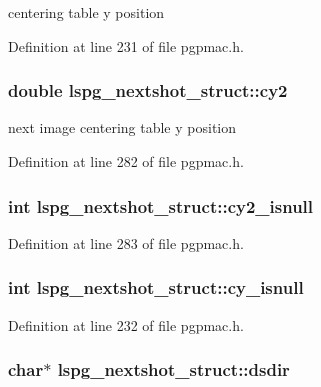 centering table y position 



Definition at line 231 of file pgpmac.\-h.

\hypertarget{structlspg__nextshot__struct_a3644e5c3f12af18a3b426d4d4d7e16a5}{
\subsubsection[{cy2}]{\setlength{\rightskip}{0pt plus 5cm}double lspg\-\_\-nextshot\-\_\-struct\-::cy2}}\label{structlspg__nextshot__struct_a3644e5c3f12af18a3b426d4d4d7e16a5}


next image centering table y position 



Definition at line 282 of file pgpmac.\-h.

\hypertarget{structlspg__nextshot__struct_a57d78a389413827302df6ebe3dcb3c89}{
\subsubsection[{cy2\-\_\-isnull}]{\setlength{\rightskip}{0pt plus 5cm}int lspg\-\_\-nextshot\-\_\-struct\-::cy2\-\_\-isnull}}\label{structlspg__nextshot__struct_a57d78a389413827302df6ebe3dcb3c89}


Definition at line 283 of file pgpmac.\-h.

\hypertarget{structlspg__nextshot__struct_a3895d645420848aed05b95694ec8c6c7}{
\subsubsection[{cy\-\_\-isnull}]{\setlength{\rightskip}{0pt plus 5cm}int lspg\-\_\-nextshot\-\_\-struct\-::cy\-\_\-isnull}}\label{structlspg__nextshot__struct_a3895d645420848aed05b95694ec8c6c7}


Definition at line 232 of file pgpmac.\-h.

\hypertarget{structlspg__nextshot__struct_ac372e1774a25b3d4bfbb9169762eb39e}{
\subsubsection[{dsdir}]{\setlength{\rightskip}{0pt plus 5cm}char$\ast$ lspg\-\_\-nextshot\-\_\-struct\-::dsdir}}\label{structlspg__nextshot__struct_ac372e1774a25b3d4bfbb9169762eb39e}



